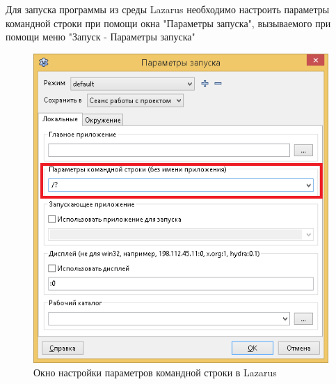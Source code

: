 \documentclass{beamer}
\begin{document}
\begin{frame}[fragile]
Для запуска программы из среды Lazarus необходимо настроить параметры командной строки при помощи окна "Параметры запуска", вызываемого при помощи меню "Запуск - Параметры запуска"
\begin{center}
\begin{figure}
\includegraphics[scale=0.4]{images/lec13-pic06.png}
\caption{Окно настройки параметров командной строки в Lazarus}
\end{figure}
\end{center}
\end{frame}
\end{document}

